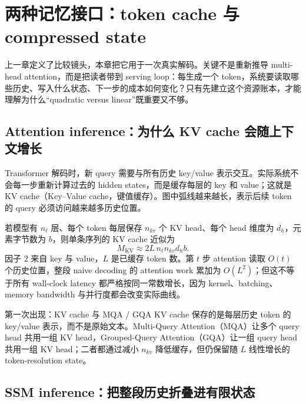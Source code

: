 \section{两种记忆接口：token cache 与 compressed state}

上一章定义了比较镜头，本章把它用于一次真实解码。关键不是重新推导 multi-head attention，而是把读者带到 serving loop：每生成一个 token，系统要读取哪些历史、写入什么状态、下一步的成本如何变化？只有先建立这个资源账本，才能理解为什么“quadratic versus linear”既重要又不够。

\subsection{Attention inference：为什么 KV cache 会随上下文增长}

Transformer 解码时，新 query 需要与所有历史 key/value 表示交互。实际系统不会每一步重新计算过去的 hidden states，而是缓存每层的 key 和 value；这就是 KV cache（Key--Value cache，键值缓存）。图中弧线越来越长，表示后续 token 的 query 必须访问越来越多历史位置。


若模型有 $n_\ell$ 层、每个 token 每层保存 $n_{kv}$ 个 KV head、每个 head 维度为 $d_h$，元素字节数为 $b$，则单条序列的 KV cache 近似为
\[
M_{\mathrm{KV}}\approx 2L\,n_\ell n_{kv}d_h b.
\]
因子 $2$ 来自 key 与 value，$L$ 是已缓存 token 数。第 $t$ 步 attention 读取 $O(t)$ 个历史位置，整段 naive decoding 的 attention work 累加为 $O(L^2)$；但这不等于所有 wall-clock latency 都严格按同一常数增长，因为 kernel、batching、memory bandwidth 与并行度都会改变实际曲线。

\begin{knowledgebox}{第一次出现：KV cache 与 MQA / GQA}
KV cache 保存的是每层历史 token 的 key/value 表示，而不是原始文本。Multi-Query Attention（MQA）让多个 query head 共用一组 KV head，Grouped-Query Attention（GQA）让一组 query head 共用一组 KV head；二者都通过减小 $n_{kv}$ 降低缓存，但仍保留随 $L$ 线性增长的 token-resolution state。
\end{knowledgebox}


\subsection{SSM inference：把整段历史折叠进有限状态}

